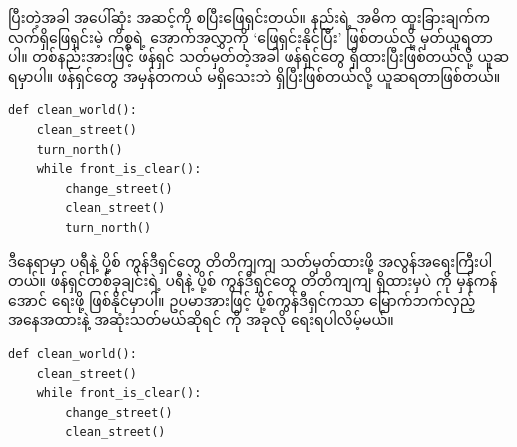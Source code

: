 ပြီးတဲ့အခါ အပေါ်ဆုံး အဆင့်ကို စပြီးဖြေရှင်းတယ်။  နည်းရဲ့ အဓိက ထူးခြားချက်က လက်ရှိဖြေရှင်းမဲ့ ကိစ္စရဲ့ အောက်အလွှာကို ‘ဖြေရှင်းနိုင်ပြီး’ ဖြစ်တယ်လို့ မှတ်ယူရတာပါ။ တစ်နည်းအားဖြင့်  ဖန်ရှင် သတ်မှတ်တဲ့အခါ \fEn{,} \fEn{,}  ဖန်ရှင်တွေ ရှိထားပြီးဖြစ်တယ်လို့ ယူဆရမှာပါ။  ဖန်ရှင်တွေ အမှန်တကယ် မရှိသေးဘဲ ရှိပြီးဖြစ်တယ်လို့ ယူဆရတာဖြစ်တယ်။
%
\setlength{\fboxsep}{0pt}
\begin{verbatim}
def clean_world():
    clean_street()
    turn_north()
    while front_is_clear():
        change_street()
        clean_street()
        turn_north()
\end{verbatim}
%
ဒီနေရာမှာ ပရီနဲ့ ပို့စ် ကွန်ဒီရှင်တွေ တိတိကျကျ သတ်မှတ်ထားဖို့ အလွန်အရေးကြီးပါတယ်။ \fEn{,} \fEn{,}  ဖန်ရှင်တစ်ခုချင်းရဲ့ ပရီနဲ့ ပို့စ် ကွန်ဒီရှင်တွေ တိတိကျကျ ရှိထားမှပဲ  ကို မှန်ကန်အောင် ရေးဖို့ ဖြစ်နိုင်မှာပါ။ ဥပမာအားဖြင့်  ပို့စ်ကွန်ဒီရှင်ကသာ မြောက်ဘက်လှည့် အနေအထားနဲ့ အဆုံးသတ်မယ်ဆိုရင်  ကို အခုလို ရေးရပါလိမ့်မယ်။
%
\setlength{\fboxsep}{0pt}
\begin{verbatim}
def clean_world():
    clean_street()
    while front_is_clear():
        change_street()
        clean_street()
\end{verbatim}
%

